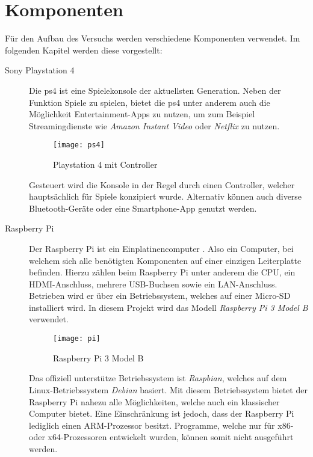 \newpage
\section{Komponenten}\label{sec:komponenten}
Für den Aufbau des Versuchs werden verschiedene Komponenten verwendet.
Im folgenden Kapitel werden diese vorgestellt:

\begin{description}
    \item[Sony Playstation 4 \cite{PS4Welco38:online}]
        Die \ac{ps4} ist eine Spielekonsole der aktuellsten Generation.
        Neben der Funktion Spiele zu spielen, bietet die \ac{ps4}
        unter anderem auch die Möglichkeit Entertainment-Apps zu nutzen,
        um zum Beispiel Streamingdienste wie \textit{Amazon Instant Video}
        oder \textit{Netflix} zu nutzen.

        \begin{figure}[h!]
            \centering
            \texttt{[image: ps4]}
            \caption{Playstation 4 mit Controller}\label{fig:ps4}
        \end{figure}

        Gesteuert wird die Konsole in der Regel durch einen Controller,
        welcher hauptsächlich für Spiele konzipiert wurde.
        Alternativ können auch diverse Bluetooth-Geräte oder eine Smartphone-App genutzt werden.

    \newpage

    \item[Raspberry Pi \cite{Whatisth47:online}]
        Der Raspberry Pi ist ein Einplatinencomputer \cite{Einplati37:online}.
        Also ein Computer,
        bei welchem sich alle benötigten Komponenten auf einer einzigen Leiterplatte befinden.
        Hierzu zählen beim Raspberry Pi unter anderem die CPU, ein HDMI-Anschluss, mehrere USB-Buchsen sowie ein LAN-Anschluss.
        Betrieben wird er über ein Betriebssystem, welches auf einer Micro-SD installiert wird.
        In diesem Projekt wird das Modell \textit{Raspberry Pi 3 Model B} verwendet.

        \begin{figure}[h!]
            \centering
            \texttt{[image: pi]}
            \caption{Raspberry Pi 3 Model B \cite{Raspberr2:online}}\label{fig:pi}
        \end{figure}

        Das offiziell unterstütze Betriebssystem ist \textit{Raspbian},
        welches auf dem Linux-Betriebssystem \textit{Debian} basiert.
        Mit diesem Betriebssystem bietet der Raspberry Pi nahezu alle Möglichkeiten,
        welche auch ein klassischer Computer bietet.
        Eine Einschränkung ist jedoch, dass der Raspberry Pi lediglich einen ARM-Prozessor besitzt.
        Programme, welche nur für x86- oder x64-Prozessoren entwickelt wurden,
        können somit nicht ausgeführt werden.


\end{description}
